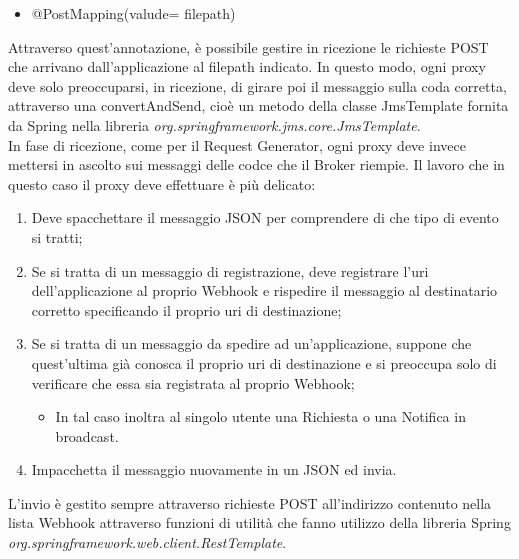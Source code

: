 \begin{itemize}
	\item @PostMapping(valude= {filepath})
\end{itemize}

Attraverso quest'annotazione, è possibile gestire in ricezione le richieste POST che arrivano dall'applicazione al filepath indicato. In questo modo, ogni proxy deve solo preoccuparsi, in ricezione, di girare poi il messaggio sulla coda corretta, attraverso una convertAndSend, cioè un metodo della classe JmsTemplate fornita da Spring nella libreria \textit{org.springframework.jms.core.JmsTemplate}. \vspace{0.5cm}
\\In fase di ricezione, come per il Request Generator, ogni proxy deve invece mettersi in ascolto sui messaggi delle codce che il Broker riempie. Il lavoro che in questo caso il proxy deve effettuare è più delicato: 

\begin{enumerate}
      \item Deve spacchettare il messaggio JSON per comprendere di che tipo di evento si tratti;
            
      \item Se si tratta di un messaggio di registrazione, deve registrare l'uri dell'applicazione al proprio Webhook e rispedire il messaggio al destinatario corretto specificando il proprio uri di destinazione;
      
      \item Se si tratta di un messaggio da spedire ad un'applicazione, suppone che quest'ultima già conosca il proprio uri di destinazione e si preoccupa solo di verificare che essa sia registrata al proprio Webhook;
      \begin{itemize}
        \item In tal caso inoltra al singolo utente una Richiesta o una Notifica in broadcast. 
      \end{itemize}
      
      \item Impacchetta il messaggio nuovamente in un JSON ed invia. 
\end{enumerate}

L'invio è gestito sempre attraverso richieste POST all'indirizzo contenuto nella lista Webhook attraverso funzioni di utilità che fanno utilizzo della libreria Spring \textit{org.springframework.web.client.RestTemplate}. 

